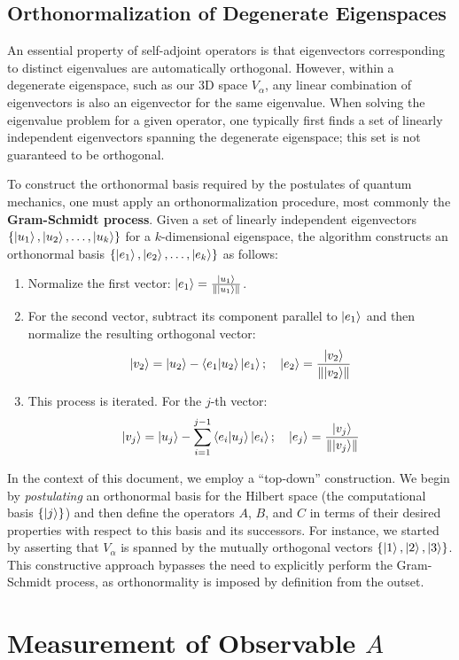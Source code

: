 \documentclass[11pt,a4paper]{article}
\begin{document}
\subsection{Orthonormalization of Degenerate Eigenspaces}
An essential property of self-adjoint operators is that eigenvectors
corresponding to distinct eigenvalues are automatically orthogonal. However,
within a degenerate eigenspace, such as our 3D space $V_\alpha$, any linear
combination of eigenvectors is also an eigenvector for the same eigenvalue. When
solving the eigenvalue problem for a given operator, one typically first finds a
set of linearly independent eigenvectors spanning the degenerate eigenspace;
this set is not guaranteed to be orthogonal.

To construct the orthonormal basis required by the postulates of quantum
mechanics, one must apply an orthonormalization procedure, most commonly the
\textbf{Gram-Schmidt process}. Given a set of linearly independent eigenvectors
$\{\ket{u_1}, \ket{u_2}, \dots, \ket{u_k}\}$ for a $k$-dimensional eigenspace,
the algorithm constructs an orthonormal basis $\{\ket{e_1}, \ket{e_2}, \dots,
\ket{e_k}\}$ as follows:
\begin{enumerate}
  \item Normalize the first vector: $\ket{e_1} =
    \frac{\ket{u_1}}{\norm{\ket{u_1}}}$.
  \item For the second vector, subtract its component parallel to $\ket{e_1}$
    and then normalize the resulting orthogonal vector:
    $$ \ket{v_2} = \ket{u_2} - \braket{e_1}{u_2}\ket{e_1}; \quad \ket{e_2} =
    \frac{\ket{v_2}}{\norm{\ket{v_2}}} $$
  \item This process is iterated. For the $j$-th vector:
    $$ \ket{v_j} = \ket{u_j} - \sum_{i=1}^{j-1} \braket{e_i}{u_j}\ket{e_i};
    \quad \ket{e_j} = \frac{\ket{v_j}}{\norm{\ket{v_j}}} $$
\end{enumerate}
In the context of this document, we employ a ``top-down'' construction. We begin
by \textit{postulating} an orthonormal basis for the Hilbert space (the
computational basis $\{\ket{j}\}$) and then define the operators $A$, $B$, and
$C$ in terms of their desired properties with respect to this basis and its
successors. For instance, we started by asserting that $V_\alpha$ is spanned by
the mutually orthogonal vectors $\{\ket{1}, \ket{2}, \ket{3}\}$. This
constructive approach bypasses the need to explicitly perform the Gram-Schmidt
process, as orthonormality is imposed by definition from the outset.

\section{Measurement of Observable \texorpdfstring{$A$}{A}}
\end{document}

